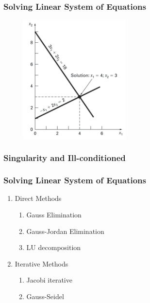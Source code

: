 \documentclass[notes]{beamer}
\begin{document}
\begin{frame}
	\frametitle{Solving Linear System of Equations}
	\begin{figure}[ht]
		\centering
		\includegraphics[width=0.5\textwidth]{figs/graphical-linear-systems.png}
	\end{figure}
\end{frame}

\begin{frame}
	\frametitle{Singularity and Ill-conditioned}
\end{frame}

\begin{frame}
	\frametitle{Solving Linear System of Equations}
	\begin{enumerate}
		\item Direct Methods
		\begin{enumerate}
			\item Gauss Elimination
			\item Gauss-Jordan Elimination
			\item LU decomposition
		\end{enumerate}
		\item Iterative Methods
		\begin{enumerate}
			\item Jacobi iterative
			\item Gauss-Seidel
		\end{enumerate}
	\end{enumerate}
\end{frame}
\end{document}
